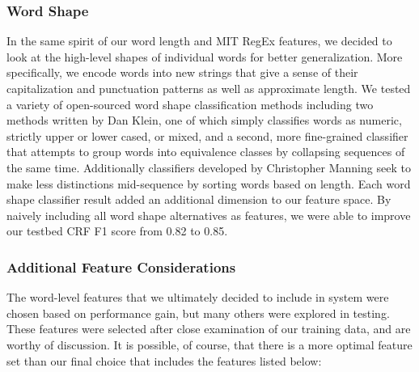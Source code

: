 \documentclass[preprint]{style}
\begin{document}
\subsubsection{Word Shape}
In the same spirit of our word length and MIT RegEx features, we decided to look at the high-level shapes of individual words for better generalization. More specifically, we encode words into new strings that give a sense of their capitalization and punctuation patterns as well as approximate length. We tested a variety of open-sourced word shape classification methods including two methods written by Dan Klein, one of which simply classifies words as numeric, strictly upper or lower cased, or mixed, and a second, more fine-grained classifier that attempts to group words into equivalence classes by collapsing sequences of the same time. Additionally classifiers developed by Christopher Manning seek to make less distinctions mid-sequence by sorting words based on length. Each word shape classifier result added an additional dimension to our feature space. By naively including all word shape alternatives as features, we were able to improve our testbed CRF F1 score from 0.82 to 0.85.

\subsubsection{Additional Feature Considerations}
The word-level features that we ultimately decided to include in system were chosen based on performance gain, but many others were explored in testing. These features were selected after close examination of our training data, and are worthy of discussion. It is possible, of course, that there is a more optimal feature set than our final choice that includes the features listed below:
\end{document}
